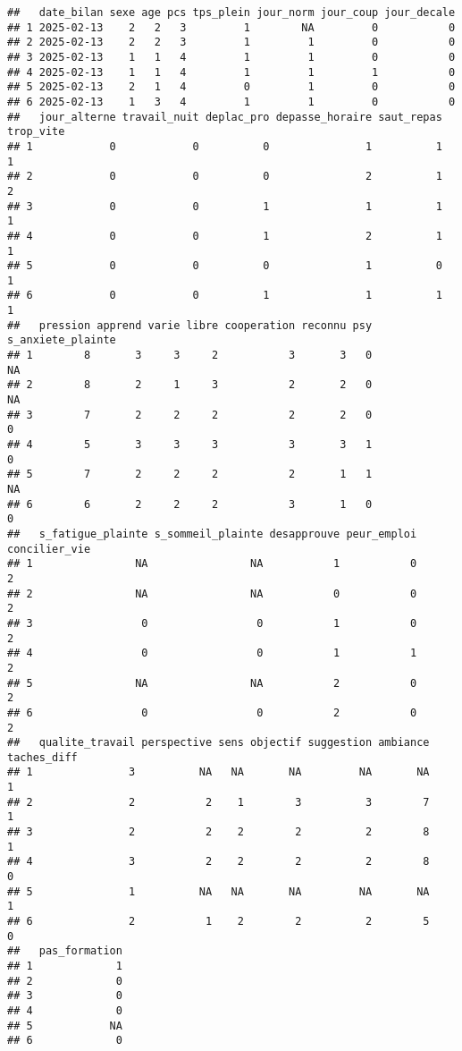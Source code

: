 \documentclass[
]{article}
\begin{document}
\begin{verbatim}
##   date_bilan sexe age pcs tps_plein jour_norm jour_coup jour_decale
## 1 2025-02-13    2   2   3         1        NA         0           0
## 2 2025-02-13    2   2   3         1         1         0           0
## 3 2025-02-13    1   1   4         1         1         0           0
## 4 2025-02-13    1   1   4         1         1         1           0
## 5 2025-02-13    2   1   4         0         1         0           0
## 6 2025-02-13    1   3   4         1         1         0           0
##   jour_alterne travail_nuit deplac_pro depasse_horaire saut_repas trop_vite
## 1            0            0          0               1          1         1
## 2            0            0          0               2          1         2
## 3            0            0          1               1          1         1
## 4            0            0          1               2          1         1
## 5            0            0          0               1          0         1
## 6            0            0          1               1          1         1
##   pression apprend varie libre cooperation reconnu psy s_anxiete_plainte
## 1        8       3     3     2           3       3   0                NA
## 2        8       2     1     3           2       2   0                NA
## 3        7       2     2     2           2       2   0                 0
## 4        5       3     3     3           3       3   1                 0
## 5        7       2     2     2           2       1   1                NA
## 6        6       2     2     2           3       1   0                 0
##   s_fatigue_plainte s_sommeil_plainte desapprouve peur_emploi concilier_vie
## 1                NA                NA           1           0             2
## 2                NA                NA           0           0             2
## 3                 0                 0           1           0             2
## 4                 0                 0           1           1             2
## 5                NA                NA           2           0             2
## 6                 0                 0           2           0             2
##   qualite_travail perspective sens objectif suggestion ambiance taches_diff
## 1               3          NA   NA       NA         NA       NA           1
## 2               2           2    1        3          3        7           1
## 3               2           2    2        2          2        8           1
## 4               3           2    2        2          2        8           0
## 5               1          NA   NA       NA         NA       NA           1
## 6               2           1    2        2          2        5           0
##   pas_formation
## 1             1
## 2             0
## 3             0
## 4             0
## 5            NA
## 6             0
\end{verbatim}
\end{document}
